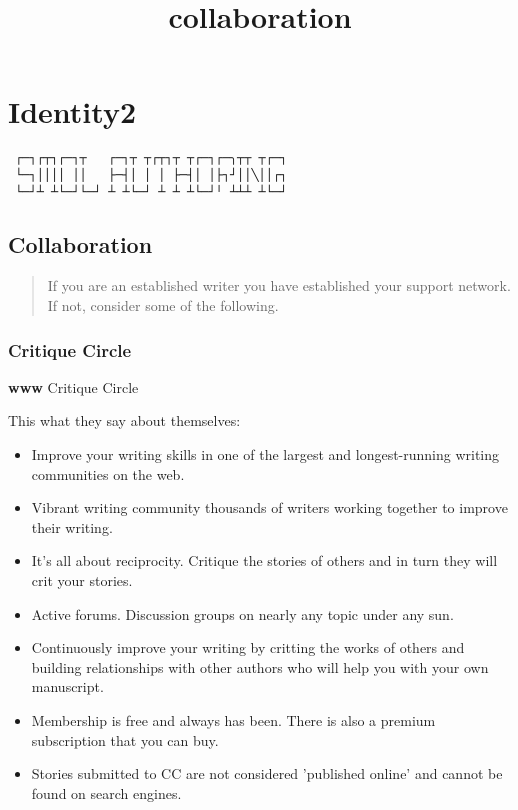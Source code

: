 \documentclass[
]{article}
\title{collaboration}
\author{}
\date{}
\begin{document}
\maketitle

\section{Identity2}

\begin{verbatim}
 ┌─┐┌┬┐┌─┐┬   ┌─┐┬ ┬┌┬┐┬ ┬┌─┐┌─╮┬┬ ┬┌─┐
 └─┐││││ ││   ├─┤│ │ │ ├─┤│ │├┐┘││╲││┌┐
 └─┘┴ ┴└─┘└─┘ ┴ ┴└─┘ ┴ ┴ ┴└─┘╵ ┴┴┴ ┴└─┘
\end{verbatim}

\subsection{Collaboration}

\begin{quote}
If you are an established writer you have established your support
network. If not, consider some of the following.
\end{quote}

\subsubsection{Critique Circle}

\textbf{www} Critique Circle

This what they say about themselves:

\begin{itemize}
\item
  Improve your writing skills in one of the largest and longest-running
  writing communities on the web.
\item
  Vibrant writing community thousands of writers working together to
  improve their writing.
\item
  It's all about reciprocity. Critique the stories of others and in turn
  they will crit your stories.
\item
  Active forums. Discussion groups on nearly any topic under any sun.
\item
  Continuously improve your writing by critting the works of others and
  building relationships with other authors who will help you with your
  own manuscript.
\item
  Membership is free and always has been. There is also a premium
  subscription that you can buy.
\item
  Stories submitted to CC are not considered 'published online' and
  cannot be found on search engines.
\end{itemize}
\end{document}
